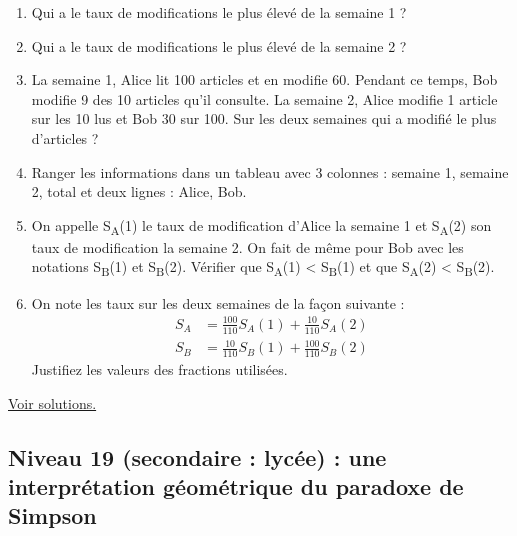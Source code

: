 \documentclass[11pt]{article}
\begin{document}
\begin{enumerate}
\item Qui a le taux de modifications le plus élevé de la semaine 1 ?
\item Qui a le taux de modifications le plus élevé de la semaine 2 ?
\item La semaine 1, Alice lit 100 articles et en modifie 60. Pendant ce
temps, Bob modifie 9 des 10 articles qu'il consulte. La semaine 2,
Alice modifie 1 article sur les 10 lus et Bob 30 sur 100.
Sur les deux semaines qui a modifié le plus d'articles ?
\item Ranger les informations dans un tableau avec 3 colonnes : semaine
1, semaine 2, total et deux lignes : Alice, Bob.
\item On appelle S\textsubscript{A}(1) le taux de modification d'Alice la semaine 1 et
S\textsubscript{A}(2) son taux de modification la semaine 2. On fait de même
pour Bob avec les notations S\textsubscript{B}(1) et S\textsubscript{B}(2). Vérifier que
S\textsubscript{A}(1) < S\textsubscript{B}(1) et que S\textsubscript{A}(2) < S\textsubscript{B}(2).
\item On note les taux sur les deux semaines de la façon suivante :
\begin{align*}
       S_A &= \frac{100}{110}S_A(1) + \frac{10}{110}S_A(2) \\
       S_B &= \frac{10}{110}S_B(1) + \frac{100}{110}S_B(2)
\end{align*}
Justifiez les valeurs des fractions utilisées.
\end{enumerate}


\hyperref[org6a03837]{Voir solutions.}

\newpage



\subsection{Niveau 19 (secondaire : lycée) : une interprétation géométrique du paradoxe de Simpson}
\label{sec:org70aaebb}

\label{org28cf025}
\end{document}

